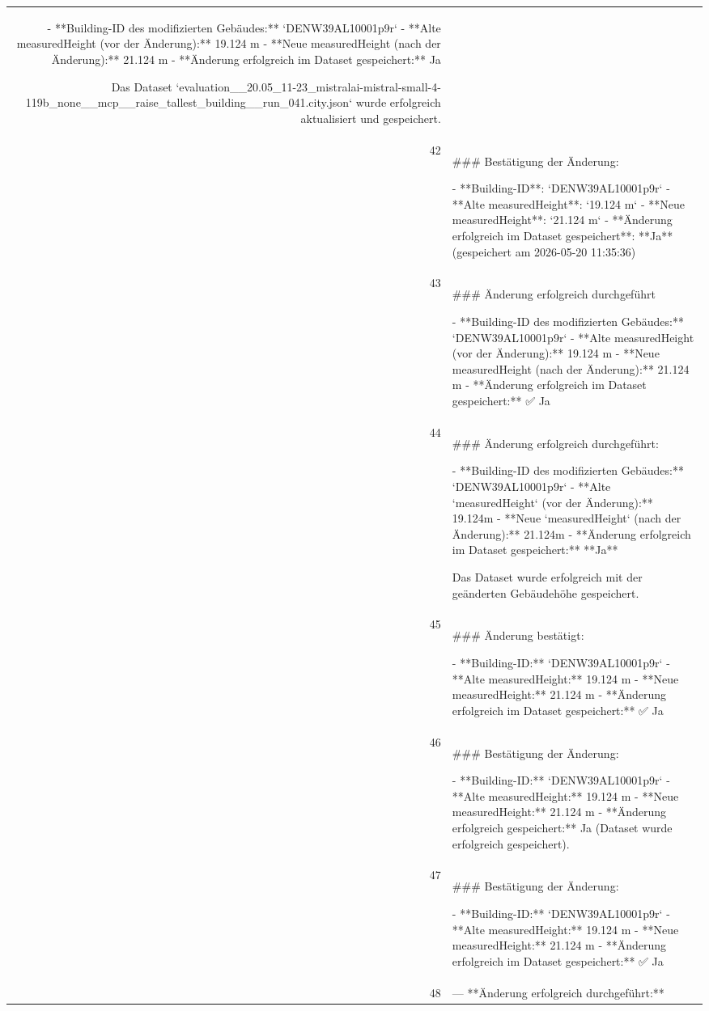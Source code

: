\documentclass[a4paper,11pt]{article}
\begin{document}
\begin{table}[ht]
\begin{tabular}{r p{12cm}}
- **Building-ID des modifizierten Gebäudes:** `DENW39AL10001p9r`
- **Alte measuredHeight (vor der Änderung):** 19.124 m
- **Neue measuredHeight (nach der Änderung):** 21.124 m
- **Änderung erfolgreich im Dataset gespeichert:** Ja

Das Dataset `evaluation\_\_20.05\_11-23\_mistralai-mistral-small-4-119b\_none\_\_mcp\_\_raise\_tallest\_building\_\_run\_041.city.json` wurde erfolgreich aktualisiert und gespeichert. \\
42 & \#\#\# Bestätigung der Änderung:

- **Building-ID**: `DENW39AL10001p9r`
- **Alte measuredHeight**: `19.124 m`
- **Neue measuredHeight**: `21.124 m`
- **Änderung erfolgreich im Dataset gespeichert**: **Ja** (gespeichert am 2026-05-20 11:35:36) \\
43 & \#\#\# Änderung erfolgreich durchgeführt

- **Building-ID des modifizierten Gebäudes:** `DENW39AL10001p9r`
- **Alte measuredHeight (vor der Änderung):** 19.124 m
- **Neue measuredHeight (nach der Änderung):** 21.124 m
- **Änderung erfolgreich im Dataset gespeichert:** ✅ Ja \\
44 & \#\#\# Änderung erfolgreich durchgeführt:

- **Building-ID des modifizierten Gebäudes:** `DENW39AL10001p9r`
- **Alte `measuredHeight` (vor der Änderung):** 19.124m
- **Neue `measuredHeight` (nach der Änderung):** 21.124m
- **Änderung erfolgreich im Dataset gespeichert:** **Ja**

Das Dataset wurde erfolgreich mit der geänderten Gebäudehöhe gespeichert. \\
45 & \#\#\# Änderung bestätigt:

- **Building-ID:** `DENW39AL10001p9r`
- **Alte measuredHeight:** 19.124 m
- **Neue measuredHeight:** 21.124 m
- **Änderung erfolgreich im Dataset gespeichert:** ✅ Ja \\
46 & \#\#\# Bestätigung der Änderung:

- **Building-ID:** `DENW39AL10001p9r`
- **Alte measuredHeight:** 19.124 m
- **Neue measuredHeight:** 21.124 m
- **Änderung erfolgreich gespeichert:** Ja (Dataset wurde erfolgreich gespeichert). \\
47 & \#\#\# Bestätigung der Änderung:

- **Building-ID:** `DENW39AL10001p9r`
- **Alte measuredHeight:** 19.124 m
- **Neue measuredHeight:** 21.124 m
- **Änderung erfolgreich im Dataset gespeichert:** ✅ Ja \\
48 & ---
**Änderung erfolgreich durchgeführt:**


\end{tabular}
\end{table}
\end{document}

